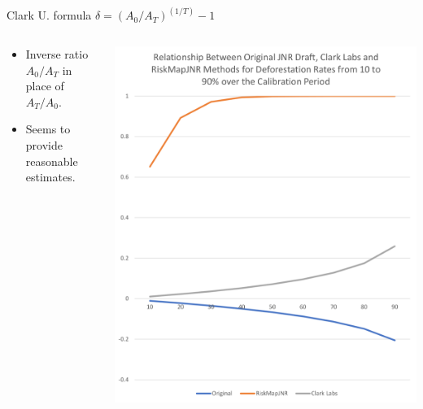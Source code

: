 \documentclass[10pt,table,dvipsnames,compress]{beamer}
\begin{document}
\begin{frame}[label={sec:orgceac932}]{Clark U. formula}
\centering \alert{\alert{\(\delta = (A_0/A_T)^{(1/T)}-1\)}}
\vspace{0.25cm}

\begin{columns}
\begin{column}{0.5\columnwidth}
\begin{itemize}
\item Inverse ratio \(A_0/A_T\) in place of \(A_T/A_0\).
\item Seems to provide reasonable estimates.
\end{itemize}
\end{column}

\begin{column}{0.5\columnwidth}
\begin{center}
\includegraphics[width=\textwidth]{figs/clarku.png}
\end{center}
\end{column}
\end{columns}
\end{frame}
\end{document}
